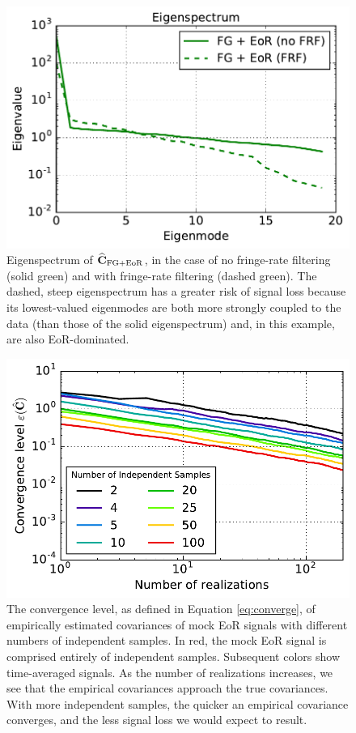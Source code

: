 \documentclass[preprint2,numberedappendix,tighten]{aastex6}
\begin{document}
\begin{figure}
	\centering
	\includegraphics[trim={0cm 0cm 0cm 0cm},clip,height=0.31\textwidth]{plots/toy_sigloss15.pdf}
	\caption{Eigenspectrum of $\widehat{\textbf{C}}_{\rm FG+EoR}$, in the case of no fringe-rate filtering (solid green) and with fringe-rate filtering (dashed green). The dashed, steep eigenspectrum has a greater risk of signal loss because its lowest-valued eigenmodes are both more strongly coupled to the data (than those of the solid eigenspectrum) and, in this example, are also EoR-dominated.}
	\label{fig:toy_sigloss15}
\end{figure}

\begin{figure}
	\centering
	\includegraphics[width=\columnwidth]{plots/toy_sigloss16.pdf}
	\caption{The convergence level, as defined in Equation \eqref{eq:converge}, of empirically estimated covariances of mock EoR signals with different numbers of independent samples. In red, the mock EoR signal is comprised entirely of independent samples. Subsequent colors show time-averaged signals. As the number of realizations increases, we see that the empirical covariances approach the true covariances. With more independent samples, the quicker an empirical covariance converges, and the less signal loss we would expect to result.}
	\label{fig:toy_sigloss16}
\end{figure}
\end{document}
